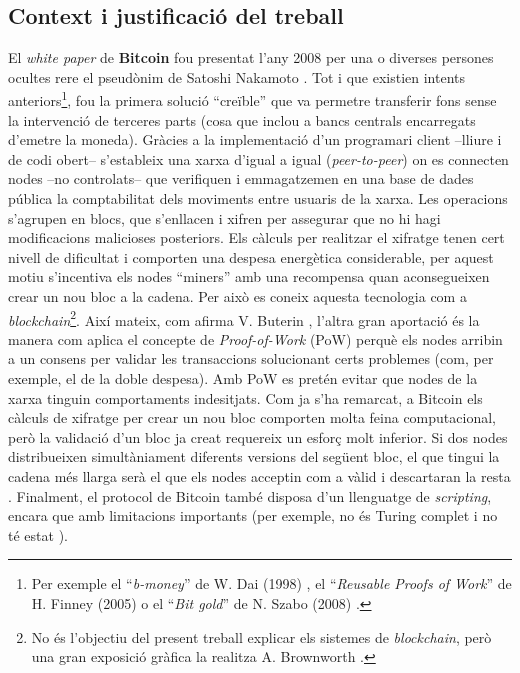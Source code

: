 \documentclass[11pt,a4paper]{article}
\begin{document}
\subsection{Context i justificació del treball}
\label{sub:context}
El \textit{white paper} de \textbf{Bitcoin} fou presentat l'any 2008 per una o diverses persones ocultes rere el pseudònim de Satoshi Nakamoto \cite{nakamoto2008}. Tot i que existien intents anteriors\footnote{Per exemple el ``\textit{b-money}'' de W. Dai (1998) \cite{dai1998}, el ``\textit{Reusable Proofs of Work}'' de H. Finney (2005) \cite{finney2005} o el ``\textit{Bit gold}'' de N. Szabo (2008) \cite{szabo2008}.}, fou la primera solució ``creïble'' \cite{vuterin2014} que va permetre transferir fons sense la intervenció de terceres parts (cosa que inclou a bancs centrals encarregats d'emetre la moneda). Gràcies a la implementació d'un programari client –lliure i de codi obert– s'estableix una xarxa d'igual a igual (\textit{peer-to-peer}) on es connecten nodes –no controlats– que verifiquen i emmagatzemen en una base de dades pública la comptabilitat dels moviments entre usuaris de la xarxa. Les operacions s'agrupen en blocs, que s'enllacen i xifren per assegurar que no hi hagi modificacions malicioses posteriors. Els càlculs per realitzar el xifratge tenen cert nivell de dificultat i comporten una despesa energètica considerable, per aquest motiu s'incentiva els nodes ``miners'' amb una recompensa quan aconsegueixen crear un nou bloc a la cadena. Per això es coneix aquesta tecnologia com a \textit{blockchain}\footnote{No és l'objectiu del present treball explicar els sistemes de \textit{blockchain}, però una gran exposició gràfica la realitza A. Brownworth \cite{brownworth1,brownworth2}.}. Així mateix, com afirma V. Buterin \cite{vuterin2014}, l'altra gran aportació és la manera com aplica el concepte de \textit{Proof-of-Work} (PoW) perquè els nodes arribin a un consens per validar les transaccions solucionant certs problemes (com, per exemple, el de la doble despesa). Amb PoW es pretén evitar que nodes de la xarxa tinguin comportaments indesitjats. Com ja s'ha remarcat, a Bitcoin els càlculs de xifratge per crear un nou bloc comporten molta feina computacional, però la validació d'un bloc ja creat requereix un esforç molt inferior. Si dos nodes distribueixen simultàniament diferents versions del següent bloc, el que tingui la cadena més llarga serà el que els nodes acceptin com a vàlid i descartaran la resta \cite{nakamoto2008}. Finalment, el protocol de Bitcoin també disposa d'un llenguatge de \textit{scripting}, encara que amb limitacions importants (per exemple, no és Turing complet i no té estat \cite{vuterin2014}). 
\end{document}
